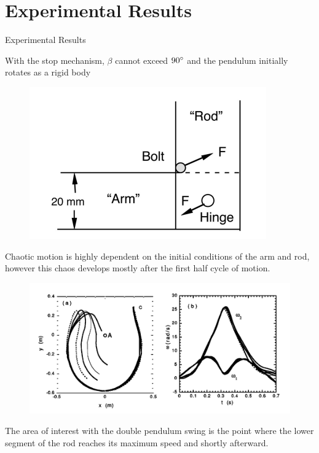 \documentclass[tikz]{beamer}
\begin{document}
\section{Experimental Results}
\begin{frame} {Experimental Results}
	
	 {
		With the stop mechanism, $\beta$ cannot exceed $90 \degree$ and the pendulum initially rotates as a rigid body
		\begin{figure}
			\centering
			\includegraphics[scale=0.5]{stopmechanism.png}
		\end{figure}
	}

	 {
		Chaotic motion is highly dependent on the initial conditions of the arm and rod, however this chaos develops mostly after the first half cycle of motion.
		\begin{figure}
			\centering
			\includegraphics[scale=0.5]{trajectory.png}
		\end{figure}

		The area of interest with the double pendulum swing is the point where the lower segment of the rod reaches its maximum speed and shortly afterward.
	}


\end{frame}
\end{document}
